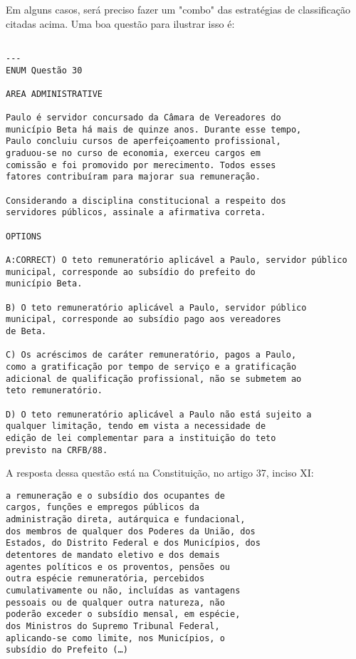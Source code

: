 \documentclass{article}
\begin{document}
Em alguns casos, será preciso fazer um "combo" das estratégias de classificação citadas acima. Uma boa questão para ilustrar isso é:

\begin{verbatim}

---
ENUM Questão 30  

AREA ADMINISTRATIVE

Paulo é servidor concursado da Câmara de Vereadores do 
município Beta há mais de quinze anos. Durante esse tempo, 
Paulo concluiu cursos de aperfeiçoamento profissional, 
graduou-se no curso de economia, exerceu cargos em 
comissão e foi promovido por merecimento. Todos esses 
fatores contribuíram para majorar sua remuneração. 
 
Considerando a disciplina constitucional a respeito dos 
servidores públicos, assinale a afirmativa correta. 
 
OPTIONS

A:CORRECT) O teto remuneratório aplicável a Paulo, servidor público 
municipal, corresponde ao subsídio do prefeito do 
município Beta. 

B) O teto remuneratório aplicável a Paulo, servidor público 
municipal, corresponde ao subsídio pago aos vereadores 
de Beta. 

C) Os acréscimos de caráter remuneratório, pagos a Paulo, 
como a gratificação por tempo de serviço e a gratificação 
adicional de qualificação profissional, não se submetem ao 
teto remuneratório. 

D) O teto remuneratório aplicável a Paulo não está sujeito a 
qualquer limitação, tendo em vista a necessidade de 
edição de lei complementar para a instituição do teto 
previsto na CRFB/88. 
\end{verbatim}

A resposta dessa questão está na Constituição, no artigo 37, inciso XI:


\begin{verbatim}
a remuneração e o subsídio dos ocupantes de
cargos, funções e empregos públicos da
administração direta, autárquica e fundacional,
dos membros de qualquer dos Poderes da União, dos
Estados, do Distrito Federal e dos Municípios, dos
detentores de mandato eletivo e dos demais
agentes políticos e os proventos, pensões ou
outra espécie remuneratória, percebidos
cumulativamente ou não, incluídas as vantagens 
pessoais ou de qualquer outra natureza, não 
poderão exceder o subsídio mensal, em espécie, 
dos Ministros do Supremo Tribunal Federal, 
aplicando-se como limite, nos Municípios, o 
subsídio do Prefeito (…)
\end{verbatim} 
\end{document}
